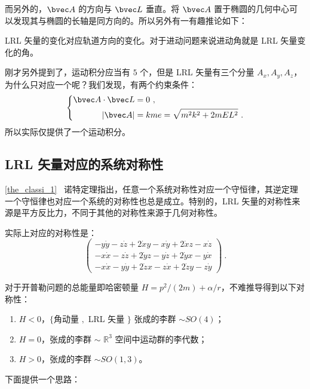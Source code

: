 而另外的，$\bvec A$ 的方向与 $\bvec L$ 垂直。将 $\bvec A$ 置于椭圆的几何中心可以发现其与椭圆的长轴是同方向的。所以另外有一有趣推论如下：
\begin{corollary}{}
LRL 矢量的变化对应轨道方向的变化。对于进动问题来说进动角就是 LRL 矢量变化的角。
\end{corollary}

刚才另外提到了，运动积分应当有 $5$ 个，但是 LRL 矢量有三个分量 $A_x, A_y, A_z$，为什么只对应一个呢？我们发现，有两个约束条件：
\begin{equation}
\left\{
\begin{aligned}
\bvec A \cdot \bvec L &= 0 ~, \\
|\bvec A| &= kme = \sqrt{m^2k^2 + 2m E L^2} ~. 
\end{aligned}
\right.
\end{equation}
所以实际仅提供了一个运动积分。

\subsection{LRL 矢量对应的系统对称性}
\autoref{the_classi_1}~ 诺特定理指出，任意一个系统对称性对应一个守恒律，其逆定理一个守恒律也对应一个系统的对称性也总是成立。特别的，LRL 矢量的对称性来源是平方反比力，不同于其他的对称性来源于几何对称性。

实际上对应的对称性是：
\begin{equation}
\begin{pmatrix}
-y\dot y-z\dot z+2\dot x y -x \dot y +2\dot x z-x\dot z \\
-x \dot x - z \dot z + 2 \dot y z - y \dot z + 2 \dot y x - y \dot x \\
-x \dot x - y \dot y + 2 \dot z x - z \dot x + 2 \dot z y - z \dot y 
\end{pmatrix} ~.
\end{equation}

对于开普勒问题的总能量即哈密顿量 $H = p^2/(2m) + \alpha/r$，不难推导得到以下对称性：
\begin{enumerate}
\item $H < 0$，$\{$角动量 $,$ LRL 矢量 $\}$ 张成的李群 $\sim SO(4)$；
\item $H = 0 $，张成的李群 $\sim$ $\mathbb R^3$ 空间中运动群的李代数；
\item $H > 0$，张成的李群 $\sim SO(1, 3)$。
\end{enumerate}
下面提供一个思路：

